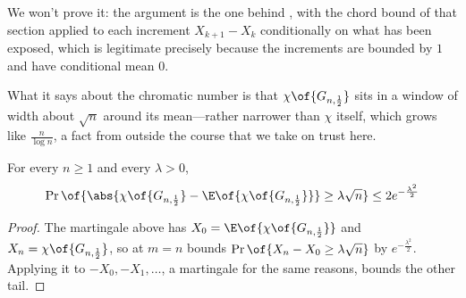We won't prove it: the argument is the one behind , with the chord bound of that section applied to each increment $X_{k+1} - X_k$ conditionally on what has been exposed, which is legitimate precisely because the increments are bounded by $1$ and have conditional mean $0$.

What it says about the chromatic number is that $\chi\of{G_{n, \frac{1}{2}}}$ sits in a window of width about $\sqrt{n}$ around its mean---rather narrower than $\chi$ itself, which grows like $\frac{n}{\log n}$, a fact from outside the course that we take on trust here.

\begin{boxcorollary} \label{Ch3:Cor:Chromatic_Concentration}
    For every $n \geq 1$ and every $\lambda > 0$,
    \begin{align*}
        \Pr\of{\abs{\chi\of{G_{n, \frac{1}{2}}} - \E\of{\chi\of{G_{n, \frac{1}{2}}}}} \geq \lambda \sqrt{n}} \leq 2 e^{-\frac{\lambda^2}{2}}
    \end{align*}
\end{boxcorollary}
\begin{proof}
    The martingale above has $X_0 = \E\of{\chi\of{G_{n, \frac{1}{2}}}}$ and $X_n = \chi\of{G_{n, \frac{1}{2}}}$, so  at $m = n$ bounds $\Pr\of{X_n - X_0 \geq \lambda \sqrt{n}}$ by $e^{-\frac{\lambda^2}{2}}$. Applying it to $-X_0, -X_1, \ldots$, a martingale for the same reasons, bounds the other tail.
\end{proof}
